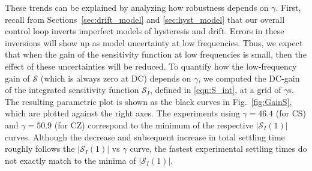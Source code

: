 \documentclass[twocolumn,twoside]{IEEEtran}
\begin{document}
These trends can be explained by analyzing how robustness depends on $\gamma$. First, recall from Sections~\ref{sec:drift_model} and \ref{sec:hyst_model} that our overall control loop inverts imperfect models of hysteresis and drift. Errors in these inversions will show up as model uncertainty at low frequencies. Thus, we expect that when the gain of the sensitivity function at low frequencies is small, then the effect of these uncertainties will be reduced. To quantify how the low-frequency gain of $\mathcal{S}$ (which is always zero at DC) depends on $\gamma$, we computed the DC-gain of the integrated sensitivity function $\mathcal{S}_I$, defined in \eqref{eqn:S_int}, at a grid of $\gamma$s. The resulting parametric plot is shown as the black curves in Fig.~\ref{fig:GainS}, which are plotted against the right axes. The experiments using ${\gamma=46.4}$ (for CS) and ${\gamma=50.9}$ (for CZ) correspond to the minimum of the respective $|\mathcal{S}_I(1)|$ curves.
Although the decrease and subsequent increase in total settling time roughly follows the $|\mathcal{S}_I(1)|$ vs $\gamma$ curve, the fastest experimental settling times do not exactly match to the minima of $|\mathcal{S}_I(1)|$.
\end{document}
